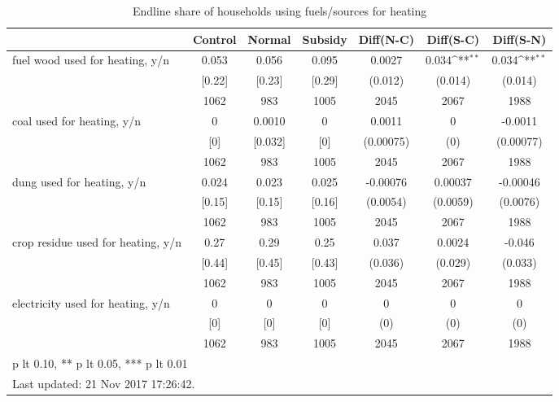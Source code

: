 \begin{table}[htbp]\centering
\def\sym#1{\ifmmode^{#1}\else\(^{#1}\)\fi}
\caption{Endline share of households using fuels/sources for heating \label{tab:"balance"}}
\begin{tabular*}{1\hsize}{@{\hskip\tabcolsep\extracolsep\fill}l*{1}{cccccc}}
\toprule
                                &  Control&   Normal&  Subsidy&Diff(N-C)         &Diff(S-C)         &Diff(S-N)         \\
\midrule
fuel wood used for heating, y/n &    0.053&    0.056&    0.095&   0.0027         &    0.034\sym{**} &    0.034\sym{**} \\
                                &   [0.22]&   [0.23]&   [0.29]&  (0.012)         &  (0.014)         &  (0.014)         \\
                                &     1062&      983&     1005&     2045         &     2067         &     1988         \\
coal used for heating, y/n      &        0&   0.0010&        0&   0.0011         &        0         &  -0.0011         \\
                                &      [0]&  [0.032]&      [0]&(0.00075)         &      (0)         &(0.00077)         \\
                                &     1062&      983&     1005&     2045         &     2067         &     1988         \\
dung used for heating, y/n      &    0.024&    0.023&    0.025& -0.00076         &  0.00037         & -0.00046         \\
                                &   [0.15]&   [0.15]&   [0.16]& (0.0054)         & (0.0059)         & (0.0076)         \\
                                &     1062&      983&     1005&     2045         &     2067         &     1988         \\
crop residue used for heating, y/n&     0.27&     0.29&     0.25&    0.037         &   0.0024         &   -0.046         \\
                                &   [0.44]&   [0.45]&   [0.43]&  (0.036)         &  (0.029)         &  (0.033)         \\
                                &     1062&      983&     1005&     2045         &     2067         &     1988         \\
electricity used for heating, y/n&        0&        0&        0&        0         &        0         &        0         \\
                                &      [0]&      [0]&      [0]&      (0)         &      (0)         &      (0)         \\
                                &     1062&      983&     1005&     2045         &     2067         &     1988         \\
\bottomrule
\multicolumn{7}{l}{\footnotesize * p lt 0.10, ** p lt 0.05, *** p lt 0.01}\\
\multicolumn{7}{l}{\footnotesize Last updated: 21 Nov 2017 17:26:42.}\\
\end{tabular*}
\end{table}
